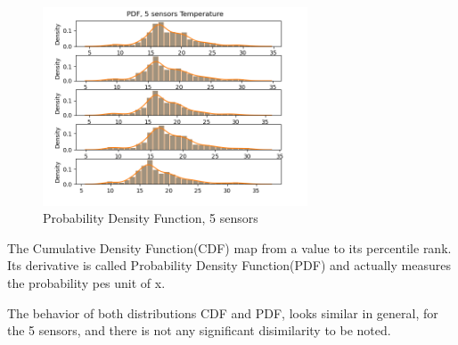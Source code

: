 \documentclass[a4paper,12pt]{article} %
\begin{document}
\begin{figure}[H]   
	\centering 
	\includegraphics[width=0.7\textwidth]{Figure_8.png}
	\caption{Probability Density Function, 5 sensors} 
\end{figure}
\vspace{5mm}
\setlength{\parindent}{8ex}The Cumulative Density Function(CDF) map from a value to its percentile rank. Its derivative is called Probability Density Function(PDF) and actually measures the probability pes unit of x. 

\setlength{\parindent}{8ex}The behavior of both distributions CDF and PDF, looks similar in general, for the 5 sensors, and there is not any significant disimilarity to be noted.
\end{document}
